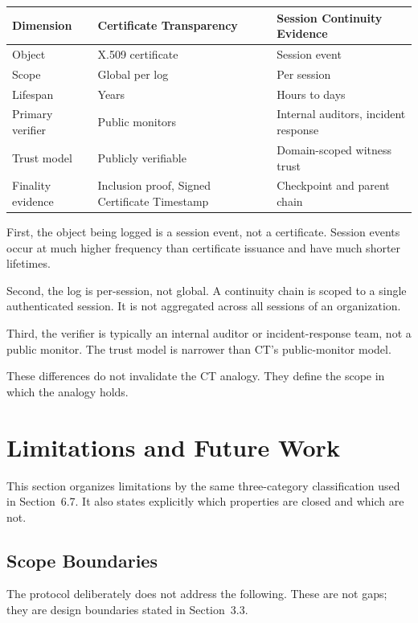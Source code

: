 \documentclass[11pt,a4paper]{article}
\begin{document}
\begin{table}[h]
\centering
\begin{tabular}{@{}lll@{}}
\toprule
Dimension & Certificate Transparency & Session Continuity Evidence \\
\midrule
Object & X.509 certificate & Session event \\
Scope & Global per log & Per session \\
Lifespan & Years & Hours to days \\
Primary verifier & Public monitors & Internal auditors, incident response \\
Trust model & Publicly verifiable & Domain-scoped witness trust \\
Finality evidence & Inclusion proof, Signed Certificate Timestamp & Checkpoint and parent chain \\
\bottomrule
\end{tabular}
\end{table}

First, the object being logged is a session event, not a certificate. Session events occur at much higher frequency than certificate issuance and have much shorter lifetimes.

Second, the log is per-session, not global. A continuity chain is scoped to a single authenticated session. It is not aggregated across all sessions of an organization.

Third, the verifier is typically an internal auditor or incident-response team, not a public monitor. The trust model is narrower than CT's public-monitor model.

These differences do not invalidate the CT analogy. They define the scope in which the analogy holds.

\section{Limitations and Future Work}

This section organizes limitations by the same three-category classification used in Section~6.7. It also states explicitly which properties are closed and which are not.

\subsection{Scope Boundaries}

The protocol deliberately does not address the following. These are not gaps; they are design boundaries stated in Section~3.3.
\end{document}

